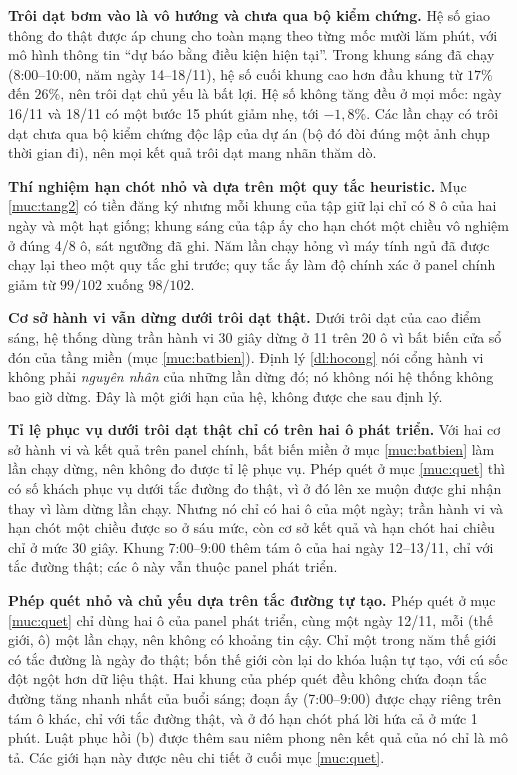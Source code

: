 \textbf{Trôi dạt bơm vào là vô hướng và chưa qua bộ kiểm chứng.} Hệ số giao thông đo thật được
áp chung cho toàn mạng theo từng mốc mười lăm phút, với mô hình thông tin ``dự báo bằng điều kiện
hiện tại''. Trong khung sáng đã chạy (8:00--10:00, năm ngày 14--18/11), hệ số cuối khung cao hơn
đầu khung từ $17\%$ đến $26\%$, nên trôi dạt chủ yếu là bất lợi. Hệ số không tăng đều ở mọi mốc:
ngày 16/11 và 18/11 có một bước 15 phút giảm nhẹ, tới $-1{,}8\%$. Các lần chạy có trôi dạt chưa qua bộ kiểm chứng
độc lập của dự án (bộ đó đòi đúng một ảnh chụp thời gian đi), nên mọi kết quả trôi dạt mang nhãn
thăm dò.

\textbf{Thí nghiệm hạn chót nhỏ và dựa trên một quy tắc heuristic.} Mục \ref{muc:tang2} có tiền đăng
ký nhưng mỗi khung của tập giữ lại chỉ có 8 ô của hai ngày và một hạt giống; khung sáng của tập ấy
cho hạn chót một chiều vô nghiệm ở đúng 4/8 ô, sát ngưỡng đã ghi. Năm lần chạy hỏng vì máy tính ngủ
đã được chạy lại theo một quy tắc ghi trước; quy tắc ấy làm độ chính xác ở panel chính giảm từ
$99/102$ xuống $98/102$.

\textbf{Cơ sở hành vi vẫn dừng dưới trôi dạt thật.} Dưới trôi dạt của cao điểm sáng, hệ thống
dùng trần hành vi 30 giây dừng ở 11 trên 20 ô vì bất biến cửa sổ đón của tầng miền (mục
\ref{muc:batbien}). Định lý \ref{dl:hocong} nói cổng hành vi không phải \emph{nguyên nhân} của
những lần dừng đó; nó không nói hệ thống không bao giờ dừng. Đây là một giới hạn của hệ, không
được che sau định lý.

\textbf{Tỉ lệ phục vụ dưới trôi dạt thật chỉ có trên hai ô phát triển.} Với hai cơ sở hành vi và kết
quả trên panel chính, bất biến miền ở mục \ref{muc:batbien} làm lần chạy dừng, nên không đo được tỉ lệ
phục vụ. Phép quét ở mục \ref{muc:quet} thì có số khách phục vụ dưới tắc đường đo thật, vì ở đó lên xe
muộn được ghi nhận thay vì làm dừng lần chạy. Nhưng nó chỉ có hai ô của một ngày; trần hành vi và hạn chót
một chiều được so ở sáu mức, còn cơ sở kết quả và hạn chót hai chiều chỉ ở mức 30 giây. Khung 7:00--9:00 thêm
tám ô của hai ngày 12--13/11, chỉ với tắc đường thật; các ô này vẫn thuộc panel phát triển.

\textbf{Phép quét nhỏ và chủ yếu dựa trên tắc đường tự tạo.} Phép quét ở mục \ref{muc:quet} chỉ dùng hai
ô của panel phát triển, cùng một ngày 12/11, mỗi (thế giới, ô) một lần chạy, nên không có khoảng tin
cậy. Chỉ một trong năm thế giới có tắc đường là ngày đo thật; bốn thế giới còn lại do khóa luận tự tạo,
với cú sốc đột ngột hơn dữ liệu thật. Hai khung của phép quét đều không chứa đoạn tắc đường tăng nhanh nhất
của buổi sáng; đoạn ấy (7:00--9:00) được chạy riêng trên tám ô khác, chỉ với tắc đường thật, và ở đó hạn chót phá lời
hứa cả ở mức 1 phút. Luật phục hồi (b) được thêm sau niêm phong nên kết quả của nó chỉ là mô tả.
Các giới hạn này được nêu chi tiết ở cuối mục \ref{muc:quet}.

